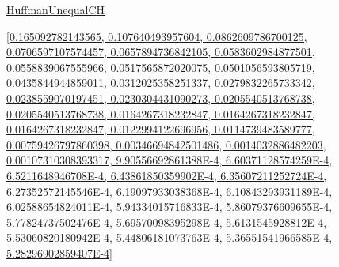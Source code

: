 \documentclass[12pt]{article}
\begin{document}
\noindent \url{HuffmanUnequalCH}

\noindent \url{[0.165092782143565, 0.107640493957604, 0.0862609786700125, 0.0706597107574457, 0.0657894736842105, 0.0583602984877501, 0.0558839067555966, 0.0517565872020075, 0.0501056593805719, 0.0435844944859011, 0.0312025358251337, 0.0279832265733342, 0.0238559070197451, 0.0230304431090273, 0.0205540513768738, 0.0205540513768738, 0.0164267318232847, 0.0164267318232847, 0.0164267318232847, 0.0122994122696956, 0.0114739483589777, 0.00759426797860398, 0.00346694842501486, 0.0014032886482203, 0.00107310308393317, 9.90556692861388E-4, 6.60371128574259E-4, 6.5211648946708E-4, 6.43861850359902E-4, 6.35607211252724E-4, 6.27352572145546E-4, 6.19097933038368E-4, 6.10843293931189E-4, 6.02588654824011E-4, 5.94334015716833E-4, 5.86079376609655E-4, 5.77824737502476E-4, 5.69570098395298E-4, 5.6131545928812E-4, 5.53060820180942E-4, 5.44806181073763E-4, 5.36551541966585E-4, 5.28296902859407E-4]}
\end{document}
